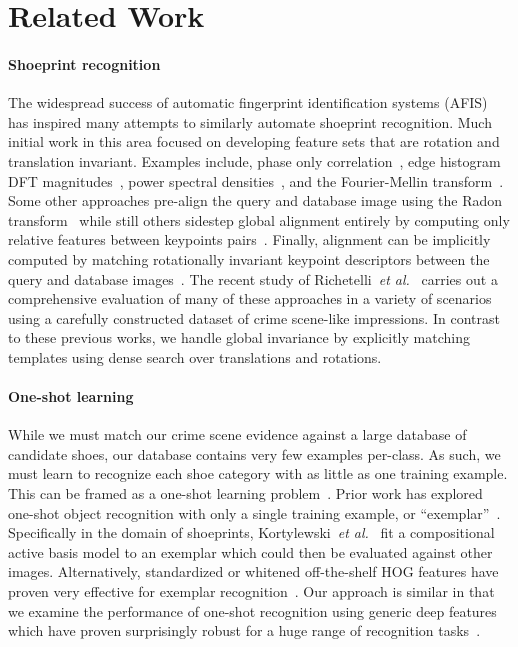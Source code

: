 \documentclass[twocolumn]{svjour3}           %
\newcommand{\etal}{\emph{et al.}}
\begin{document}
\section{Related Work}


\paragraph{Shoeprint recognition} The widespread success of automatic
fingerprint identification systems (AFIS)~\cite{lee2001advances} has inspired
many attempts to similarly automate shoeprint recognition. Much initial work in
this area focused on developing feature sets that are rotation and
translation invariant.  Examples include, phase only
correlation~\cite{gueham2008automatic}, edge histogram DFT
magnitudes~\cite{zhang2005automatic}, power spectral
densities~\cite{de2005automated,dardi2009texture}, and the Fourier-Mellin
transform~\cite{gueham2008automatic}. Some other approaches pre-align the query
and database image using the Radon transform~\cite{patil2009rotation} while
still others sidestep global alignment entirely by computing only relative
features between keypoints pairs~\cite{tang2010footwear,pavlou2006automatic}.
Finally, alignment can be implicitly computed by matching rotationally
invariant keypoint descriptors between the query and database
images~\cite{pavlou2006automatic,wei2014alignment}.  The recent study of
Richetelli~\etal~\cite{Richetelli2017} carries out a comprehensive evaluation
of many of these approaches in a variety of scenarios using a carefully
constructed dataset of crime scene-like impressions.  In contrast to these
previous works, we handle global invariance by explicitly matching templates
using dense search over translations and rotations.

\paragraph{One-shot learning}
While we must match our crime scene evidence against a large database of
candidate shoes, our database contains very few examples per-class. As such, we
must learn to recognize each shoe category with as little as one training
example. This can be framed as a one-shot learning problem~\cite{li2006one}.
Prior work has explored one-shot object recognition with only a single training
example, or ``exemplar''~\cite{malisiewicz2011ensemble}.  Specifically in the
domain of shoeprints, Kortylewski~\etal~\cite{kortylewski2016probabilistic} fit
a compositional active basis model to an exemplar which could then be evaluated
against other images.  Alternatively, standardized or whitened off-the-shelf
HOG features have proven very effective for exemplar
recognition~\cite{hariharan2012discriminative}.  Our approach is similar in
that we examine the performance of one-shot recognition using generic deep
features which have proven surprisingly robust for a huge range of recognition
tasks~\cite{sharif2014cnn}.
\end{document}
